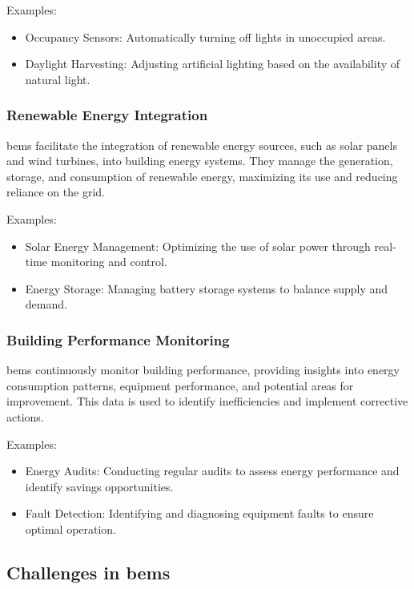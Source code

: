 Examples:
\begin{itemize}
    \item Occupancy Sensors: Automatically turning off lights in unoccupied areas.
    \item Daylight Harvesting: Adjusting artificial lighting based on the availability of natural light.
\end{itemize}

\subsubsection*{Renewable Energy Integration}

\gls{bems} facilitate the integration of renewable energy sources, such as solar panels and wind turbines, into building energy systems. They manage the generation, storage, and consumption of renewable energy, maximizing its use and reducing reliance on the grid.

Examples:
\begin{itemize}
    \item Solar Energy Management: Optimizing the use of solar power through real-time monitoring and control.
    \item Energy Storage: Managing battery storage systems to balance supply and demand.
\end{itemize}

\subsubsection*{Building Performance Monitoring}

\gls{bems} continuously monitor building performance, providing insights into energy consumption patterns, equipment performance, and potential areas for improvement. This data is used to identify inefficiencies and implement corrective actions.

Examples:
\begin{itemize}
    \item Energy Audits: Conducting regular audits to assess energy performance and identify savings opportunities.
    \item Fault Detection: Identifying and diagnosing equipment faults to ensure optimal operation.
\end{itemize}


\subsection*{Challenges in \gls{bems}}

